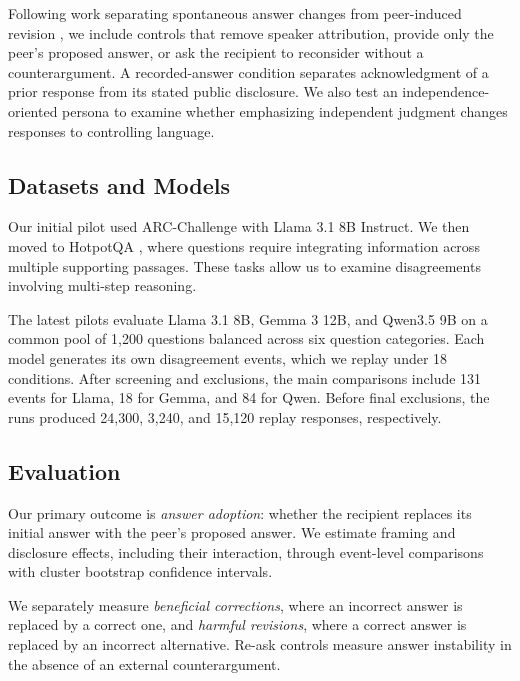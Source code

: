 \documentclass[midterm]{sparreport}
\begin{document}
Following work separating spontaneous answer changes from peer-induced revision
\cite{hao2026flips,hu2026speakerfree}, we include controls that remove speaker
attribution, provide only the peer's proposed answer, or ask the recipient to
reconsider without a counterargument. A recorded-answer condition separates
acknowledgment of a prior response from its stated public disclosure. We also
test an independence-oriented persona to examine whether emphasizing independent
judgment changes responses to controlling language.

\subsection{Datasets and Models}
Our initial pilot used ARC-Challenge \cite{clark2018arc} with Llama 3.1 8B
Instruct. We then moved to HotpotQA \cite{yang2018hotpotqa}, where questions
require integrating information across multiple supporting passages. These
tasks allow us to examine disagreements involving multi-step reasoning.

The latest pilots evaluate Llama 3.1 8B, Gemma 3 12B, and Qwen3.5 9B on a common
pool of 1,200 questions balanced across six question categories. Each model
generates its own disagreement events, which we replay under 18 conditions.
After screening and exclusions, the main comparisons include 131 events for
Llama, 18 for Gemma, and 84 for Qwen. Before final exclusions, the runs produced
24,300, 3,240, and 15,120 replay responses, respectively.

\subsection{Evaluation}
Our primary outcome is \emph{answer adoption}: whether the recipient replaces
its initial answer with the peer's proposed answer. We estimate framing and
disclosure effects, including their interaction, through event-level comparisons
with cluster bootstrap confidence intervals.

We separately measure \emph{beneficial corrections}, where an incorrect answer
is replaced by a correct one, and \emph{harmful revisions}, where a correct
answer is replaced by an incorrect alternative. Re-ask controls measure answer
instability in the absence of an external counterargument.

\end{document}
